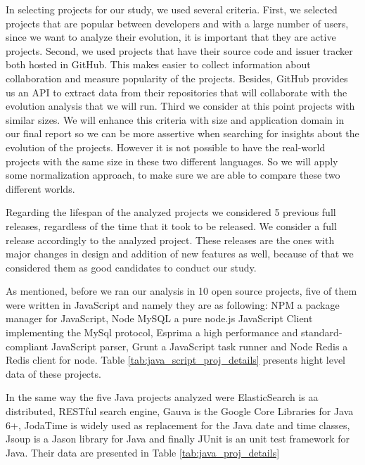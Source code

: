 In selecting projects for our study, we used several criteria. First, we selected projects that are popular between developers and with a large number of users, since we want to analyze their evolution, it is important that they are active projects. Second, we used projects that have their source code and issuer tracker both hosted in GitHub. This makes easier to collect information about collaboration and measure popularity of the projects. Besides, GitHub provides us an API to extract data from their repositories that will collaborate with the evolution analysis that we will run. Third we consider at this point projects with similar sizes. We will enhance this criteria with size and application domain in our final report so we can be more assertive when searching for insights about the evolution of the projects. However it is not possible to have the real-world projects with the same size in these two different languages. So we will apply some normalization approach, to make sure we are able to compare these two different worlds.

Regarding the lifespan of the analyzed projects we considered 5 previous full releases, regardless of the time that it took to be released. We consider a full release accordingly to the analyzed project. These releases are the ones with major changes in design and addition of new features as well, because of that we considered them as good candidates to conduct our study.  

As mentioned, before we ran our analysis in 10 open source projects, five of them were written in JavaScript and namely they are as following: NPM a package manager for JavaScript, Node MySQL a pure node.js JavaScript Client implementing the MySql protocol, Esprima a high performance and standard-compliant JavaScript parser, Grunt a JavaScript task runner and Node Redis a Redis client for node. Table \ref{tab:java_script_proj_details} presents hight level data of these projects.

In the same way the five Java projects analyzed were ElasticSearch is aa distributed, RESTful search engine, Gauva is the Google Core Libraries for Java 6+, JodaTime is widely used as replacement for the Java date and time classes, Jsoup is a Jason library for Java and finally JUnit is an unit test framework for Java. Their data are presented in Table \ref{tab:java_proj_details}     

